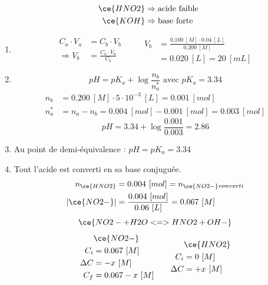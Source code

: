 \documentclass[
  11pt,
  a4paper,
  openany]{book}
\begin{document}
\begin{Answer}

\[
\begin{split}
\ce{HNO2} &\Rightarrow \text{acide faible} \\
\ce{KOH} &\Rightarrow \text{base forte}
\end{split}
\]

\begin{enumerate}
\def\labelenumi{\alph{enumi}.}
\item
  \[
  \begin{split}
  C_a \cdot V_a &= C_b \cdot V_b \\
  \Rightarrow V_b &= \frac{C_a \cdot V_a}{C_b}
  \end{split}
  \qquad
  \begin{split}
  V_b &= \frac{0.100\ [M] \cdot 0.04\ [L]}{0.200\ [M]} \\
  &= 0.020\ [L] = 20\ [mL]
  \end{split}
  \]
\item
  \[
  pH = pK_a + \log \frac{n_b}{n_a^*} \text{ avec } pK_a = 3.34
  \]
  \[
  \begin{split}
  n_b &= 0.200\ [M] \cdot 5 \cdot 10^{-3}\ [L] = 0.001\ [mol] \\
  n_a^* &= n_a - n_b = 0.004\ [mol] - 0.001\ [mol] = 0.003\ [mol]
  \end{split}
  \]
  \[
  pH = 3.34 + \log{\frac{0.001}{0.003}} = 2.86
  \]
\item
  Au point de demi-équivalence : \(pH = pK_a = 3.34\)
\item
  Tout l'acide est converti en sa base conjuguée.
  \[
  \begin{split}
  n_{\ce{HNO2}} &= 0.004\ [mol] = n_{\ce{NO2-}} {}_{converti} \\
  |\ce{NO2-}| &= \frac{0.004\ [mol]}{0.06\ [L]} = 0.067\ [M]
  \end{split}
  \]
  \[
  \ce{NO2- + H2O <=> HNO2 + OH-}
  \]
  \[
  \begin{split}
  &\ce{NO2-}\\
  C_i &= 0.067\ [M] \\
  \Delta C &= - x\ [M] \\
  C_f &= 0.067 - x\ [M] \\
  \end{split}
  \qquad
  \begin{split}
  &\ce{HNO2}\\
  C_i &= 0\ [M] \\
  \Delta C &= + x\ [M] \\

\end{split}\]
\end{enumerate}
\end{Answer}
\end{document}
